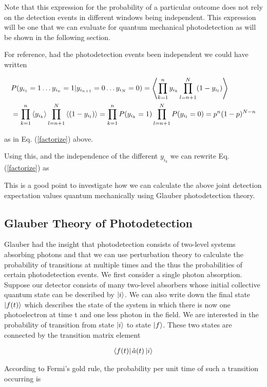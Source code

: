 \documentclass[12pt]{article}
\begin{document}
Note that this expression for the probability of a particular outcome does not rely on the detection events in different windows being independent. This expression will be one that we can evaluate for quantum mechanical photodetection as will be shown in the following section.

For reference, had the photodetection events been independent we could have written

\begin{align}
&P(y_{i_1}=1 \ldots y_{i_n}=1 | y_{i_{n+1}}=0 \ldots y_{i_N}=0) = \Braket{\prod_{k=1}^n y_{i_k} \prod_{l=n+1}^{N} (1-y_{i_l})}\\
&= \prod_{k=1}^n \Braket{y_{i_k}} \prod_{l=n+1}^{N} \Braket{(1-y_{i_l})} = \prod_{k=1}^n P(y_{i_k}=1) \prod_{l=n+1}^{N} P({y_{i_l}}=0) = p^n (1-p)^{N-n}
\end{align}


as in Eq. (\ref{factorize}) above.

Using this, and the independence of the different $y_{i_k}$ we can rewrite Eq. (\ref{factorize}) as

This is a good point to investigate how we can calculate the above joint detection expectation values quantum mechanically using Glauber photodetection theory.

\subsection{Glauber Theory of Photodetection}

Glauber had the insight that photodetection consists of two-level systems absorbing photons and that we can use perturbation theory to calculate the probability of transitions at multiple times and the thus the probabilities of certain photodetection events. We first consider a single photon absorption. Suppose our detector consists of many two-level absorbers whose initial collective quantum state can be described by $\ket{i}$. We can also write down the final state $\ket{f(t)}$ which describes the state of the system in which there is now one photoelectron at time t and one less photon in the field. We are interested in the probability of transition from state $\ket{i}$ to state $\ket{f}$. These two states are connected by the transition matrix element

\begin{align}
\bra{f(t)}\hat{a}(t)\ket{i}
\end{align}

According to Fermi's gold rule, the probability per unit time of such a transition occurring is
\end{document}
